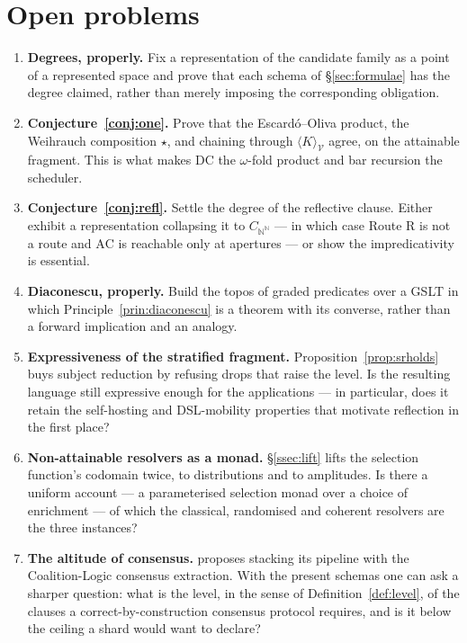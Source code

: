 \documentclass[11pt]{article}
\theoremstyle{definition}
\theoremstyle{plain}
\theoremstyle{remark}
\newcommand{\V}{\mathcal{V}}
\newcommand{\AC}{\mathrm{AC}}
\newcommand{\DC}{\mathrm{DC}}
\newcommand{\Wstar}{\star}
\newcommand{\Bai}{\mathbb{N}^{\mathbb{N}}}
\begin{document}
\section{Open problems}\label{sec:open}

\begin{enumerate}[label=O\arabic*.,leftmargin=2.6em,itemsep=3pt]
\item \textbf{Degrees, properly.} Fix a representation of the candidate family as a
point of a represented space and prove that each schema of \S\ref{sec:formulae} has
the degree claimed, rather than merely imposing the corresponding obligation.
\item \textbf{Conjecture~\ref{conj:one}.} Prove that the Escard\'o--Oliva product, the
Weihrauch composition $\Wstar$, and chaining through $\langle K \rangle_\V$ agree, on
the attainable fragment. This is what makes $\DC$ the $\omega$-fold product and bar
recursion the scheduler.
\item \textbf{Conjecture~\ref{conj:refl}.} Settle the degree of the reflective clause.
Either exhibit a representation collapsing it to $C_{\Bai}$ --- in which case
Route R is not a route and $\AC$ is reachable only at apertures --- or show the
impredicativity is essential.
\item \textbf{Diaconescu, properly.} Build the topos of graded predicates over a GSLT
in which Principle~\ref{prin:diaconescu} is a theorem with its converse, rather than a
forward implication and an analogy.
\item \textbf{Expressiveness of the stratified fragment.} Proposition~\ref{prop:srholds}
buys subject reduction by refusing drops that raise the level. Is the resulting language
still expressive enough for the applications --- in particular, does it retain the
self-hosting and DSL-mobility properties that motivate reflection in the first place?
\item \textbf{Non-attainable resolvers as a monad.} \S\ref{ssec:lift} lifts the
selection function's codomain twice, to distributions and to amplitudes. Is there a
uniform account --- a parameterised selection monad over a choice of enrichment --- of
which the classical, randomised and coherent resolvers are the three instances?
\item \textbf{The altitude of consensus.} \cite{choicesched} proposes stacking its
pipeline with the Coalition-Logic consensus extraction. With the present schemas one
can ask a sharper question: what is the level, in the sense of
Definition~\ref{def:level}, of the clauses a correct-by-construction consensus protocol
requires, and is it below the ceiling a shard would want to declare?
\end{enumerate}
\end{document}
